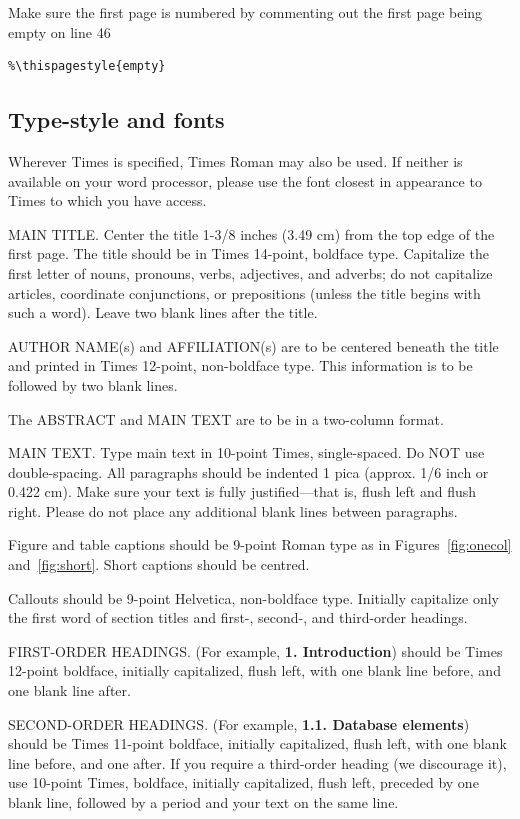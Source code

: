 \documentclass[10pt,twocolumn,letterpaper]{article}
\begin{document}
Make sure the first page is numbered by commenting out the first page being
empty on line 46
\begin{verbatim}
%\thispagestyle{empty}
\end{verbatim}


\subsection{Type-style and fonts}

Wherever Times is specified, Times Roman may also be used. If neither is
available on your word processor, please use the font closest in
appearance to Times to which you have access.

MAIN TITLE. Center the title 1-3/8 inches (3.49 cm) from the top edge of
the first page. The title should be in Times 14-point, boldface type.
Capitalize the first letter of nouns, pronouns, verbs, adjectives, and
adverbs; do not capitalize articles, coordinate conjunctions, or
prepositions (unless the title begins with such a word). Leave two blank
lines after the title.

AUTHOR NAME(s) and AFFILIATION(s) are to be centered beneath the title
and printed in Times 12-point, non-boldface type. This information is to
be followed by two blank lines.

The ABSTRACT and MAIN TEXT are to be in a two-column format.

MAIN TEXT. Type main text in 10-point Times, single-spaced. Do NOT use
double-spacing. All paragraphs should be indented 1 pica (approx. 1/6
inch or 0.422 cm). Make sure your text is fully justified---that is,
flush left and flush right. Please do not place any additional blank
lines between paragraphs.

Figure and table captions should be 9-point Roman type as in
Figures~\ref{fig:onecol} and~\ref{fig:short}.  Short captions should be centred.

\noindent Callouts should be 9-point Helvetica, non-boldface type.
Initially capitalize only the first word of section titles and first-,
second-, and third-order headings.

FIRST-ORDER HEADINGS. (For example, {\large \bf 1. Introduction})
should be Times 12-point boldface, initially capitalized, flush left,
with one blank line before, and one blank line after.

SECOND-ORDER HEADINGS. (For example, { \bf 1.1. Database elements})
should be Times 11-point boldface, initially capitalized, flush left,
with one blank line before, and one after. If you require a third-order
heading (we discourage it), use 10-point Times, boldface, initially
capitalized, flush left, preceded by one blank line, followed by a period
and your text on the same line.
\end{document}

